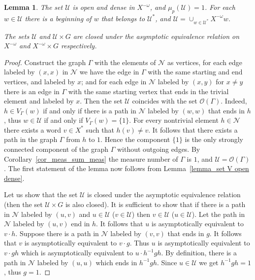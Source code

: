 \documentclass[12pt]{article}
\newcommand{\xmo}{X^{-\omega}}
\newcommand{\nucl}{\mathcal{N}}
\newcommand{\gr}{\Gamma}
\newtheorem{lemma}{Lemma}
\theoremstyle{definition}
\begin{document}
\begin{lemma}\label{lemma U_open_dense_meas1}
The set $\mathcal{U}$ is open and dense in $\xmo$, and $\mu_p(\mathcal{U})=1$. For each $w\in
\mathcal{U}$ there is a beginning of $w$ that belongs to $\mathcal{U}^*$, and
$\mathcal{U}=\cup_{w\in\mathcal{U}^*}\xmo w$.

The sets $\mathcal{U}$ and $\mathcal{U}\times G$ are closed under the asymptotic equivalence
relation on $\xmo$ and $\xmo\times G$ respectively.
\end{lemma}
\begin{proof}
Construct the graph $\gr$ with the elements of $\nucl$ as vertices, for each edge labeled by
$(x,x)$ in $\nucl$ we have the edge in $\gr$ with the same starting and end vertices, and labeled
by $x$; and for each edge in $\nucl$ labeled by $(x,y)$ for $x\neq y$ there is an edge in $\gr$
with the same starting vertex that ends in the trivial element and labeled by $x$. Then the set
$\mathcal{U}$ coincides with the set $\mathcal{O}(\gr)$. Indeed, $h\in V_{\gr}(w)$ if and only if
there is a path in $\nucl$ labeled by $(w,w)$ that ends in $h$, thus $w\in\mathcal{U}$ if and only
if $V_{\gr}(w)=\{1\}$. For every nontrivial element $h\in\nucl$ there exists a word $v\in X^{*}$
such that $h(v)\neq v$. It follows that there exists a path in the graph $\gr$ from $h$ to $1$.
Hence the component $\{1\}$ is the only strongly connected component of the graph $\gr$ without
outgoing edges. By Corollary~\ref{cor_meas_sum_meas} the measure number of $\gr$ is $1$, and
$\mathcal{U}=\mathcal{O}(\gr)$. The first statement of the lemma now follows from
Lemma~\ref{lemma_set V open dense}.


Let us show that the set $\mathcal{U}$ is closed under the asymptotic equivalence relation (then
the set $\mathcal{U}\times G$ is also closed). It is sufficient to show that if there is a path in
$\nucl$ labeled by $(u,v)$ and $u\in\mathcal{U}$ ($v\in\mathcal{U}$) then $v\in\mathcal{U}$
($u\in\mathcal{U}$). Let the path in $\nucl$ labeled by $(u,v)$ end in $h$. It follows that $u$ is
asymptotically equivalent to $v\cdot h$. Suppose there is a path in $\nucl$ labeled by $(v,v)$ that
ends in $g$. It follows that $v$ is asymptotically equivalent to $v\cdot g$. Thus $u$ is
asymptotically equivalent to $v\cdot gh$ which is asymptotically equivalent to $u\cdot h^{-1}gh$.
By definition, there is a path in $\nucl$ labeled by $(u,u)$ which ends in $h^{-1}gh$. Since
$u\in\mathcal{U}$ we get $h^{-1}gh=1$, thus $g=1$.
\end{proof}
\end{document}
